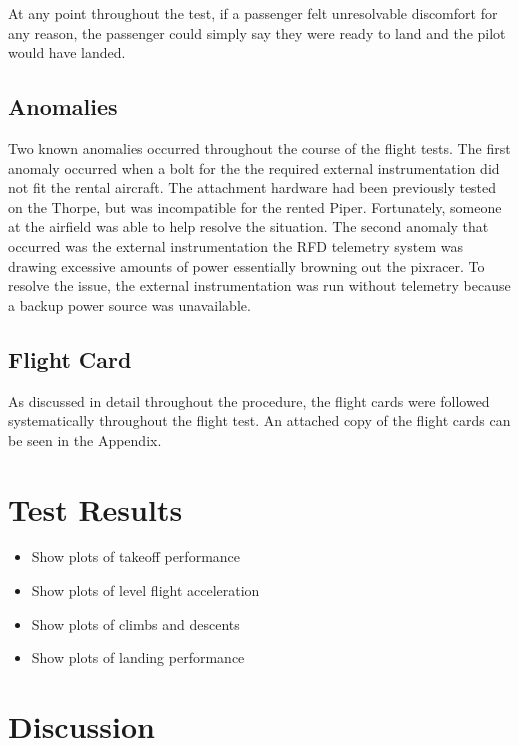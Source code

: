 \documentclass[conf]{new-aiaa}
\begin{document}
At any point throughout the test, if a passenger felt unresolvable discomfort for any reason, the passenger could simply say they were ready to land and the pilot would have landed. 

\subsection{Anomalies}

Two known anomalies occurred throughout the course of the flight tests. The first anomaly occurred when a bolt for the the required external instrumentation did not fit the rental aircraft. The attachment hardware had been previously tested on the Thorpe, but was incompatible for the rented Piper. Fortunately, someone at the airfield was able to help resolve the situation. The second anomaly that occurred was the  external instrumentation the RFD telemetry system was drawing excessive amounts of power essentially browning out the pixracer. To resolve the issue, the external instrumentation was run without telemetry because a backup power source was unavailable.   
\subsection{Flight Card}

As discussed in detail throughout the procedure, the flight cards were followed systematically throughout the flight test. An attached copy of the flight cards can be seen in the Appendix. 

\section{Test Results}

\begin{itemize}
	\item Show plots of takeoff performance
	\item Show plots of level flight acceleration
	\item Show plots of climbs and descents
	\item Show plots of landing performance
\end{itemize}

\section{Discussion}
\end{document}

